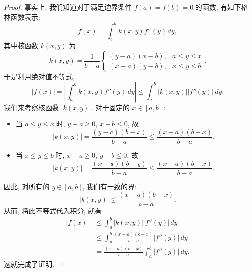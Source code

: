 \documentclass[lang=cn,10pt,thmcnt=section]{elegantbook}
\begin{document}
\begin{proof}
    事实上, 我们知道对于满足边界条件 $f(a)=f(b)=0$ 的函数, 有如下格林函数表示:
    \[
    f(x) = \int_a^b k(x,y) f''(y) \, dy,
    \]
    其中核函数 $k(x,y)$ 为
    \[
    k(x,y) = \frac{1}{b-a}
    \begin{cases}
        (y-a)(x-b), & a \le y \le x \\
        (x-a)(y-b), & x \le y \le b
    \end{cases}
    .
    \]
    于是利用绝对值不等式,
    \[
    |f(x)| = \left| \int_a^b k(x,y) f''(y) \, dy \right| \le \int_a^b |k(x,y)| |f''(y)| \, dy.
    \]
    我们来考察核函数 $|k(x,y)|$. 对于固定的 $x \in [a,b]$:
    \begin{itemize}
        \item 当 $a \le y \le x$ 时, $y-a \ge 0$, $x-b \le 0$, 故
        \[ |k(x,y)| = \frac{(y-a)(b-x)}{b-a} \le \frac{(x-a)(b-x)}{b-a}. \]
        \item 当 $x \le y \le b$ 时, $x-a \ge 0$, $y-b \le 0$, 故
        \[ |k(x,y)| = \frac{(x-a)(b-y)}{b-a} \le \frac{(x-a)(b-x)}{b-a}. \]
    \end{itemize}
    因此, 对所有的 $y \in [a,b]$, 我们有一致的界:
    \[
    |k(x,y)| \le \frac{(x-a)(b-x)}{b-a}.
    \]
    从而, 将此不等式代入积分, 就有
    \begin{align*}
        |f(x)| &\le \int_a^b |k(x,y)| |f''(y)| \, dy \\
        &\le \int_a^b \frac{(x-a)(b-x)}{b-a} |f''(y)| \, dy \\
        &= \frac{(x-a)(b-x)}{b-a} \int_a^b |f''(y)| \, dy.
    \end{align*}
    这就完成了证明.
\end{proof}
\end{document}
